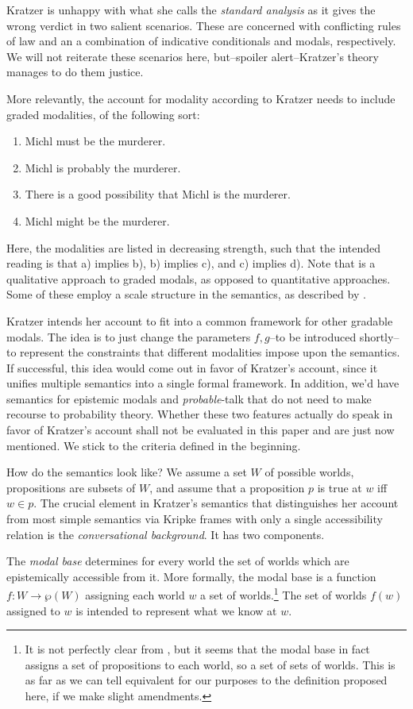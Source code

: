 \documentclass{article}
\theoremstyle{definition}
\begin{document}
Kratzer is unhappy with what she calls the \emph{standard analysis} as it gives the wrong verdict in two salient scenarios.
These are concerned with conflicting rules of law and an a combination of indicative conditionals and modals, respectively.
We will not reiterate these scenarios here, but--spoiler alert--Kratzer's theory manages to do them justice.

More relevantly, the account for modality according to Kratzer needs to include graded modalities, of the following sort:
\begin{enumerate}[nosep,label=\alph*)]
  \item Michl must be the murderer.
  \item Michl is probably the murderer.
  \item There is a good possibility that Michl is the murderer.
  \item Michl might be the murderer.
\end{enumerate}
Here, the modalities are listed in decreasing strength, such that the intended reading is that a) implies b), b) implies c), and c) implies d).
Note that is a qualitative approach to graded modals, as opposed to quantitative approaches. Some of these employ a scale structure in the semantics, as described by \textcite{lassiter10_gradab}.

Kratzer intends her account to fit into a common framework for other gradable modals.
The idea is to just change the parameters $f,g$--to be introduced shortly--to represent the constraints that different modalities impose upon the semantics.
If successful, this idea would come out in favor of Kratzer's account, since it unifies multiple semantics into a single formal framework.
In addition, we'd have semantics for epistemic modals and \emph{probable}-talk that do not need to make recourse to probability theory.
Whether these two features actually do speak in favor of Kratzer's account shall not be evaluated in this paper and are just now mentioned.
We stick to the criteria defined in the beginning.

How do the semantics look like?
We assume a set $W$ of possible worlds, propositions are subsets of $W$, and assume that a proposition $p$ is true at $w$ iff $w \in p$.
The crucial element in Kratzer's semantics that distinguishes her account from most simple semantics via Kripke frames with only a single accessibility relation is the \emph{conversational background}.
It has two components.

The \emph{modal base} determines for every world the set of worlds which are epistemically accessible from it.
More formally, the modal base is a function $f: W \rightarrow \wp(W)$ assigning each world $w$ a set of worlds.\footnote{It is not perfectly clear from \textcite[][p.~644]{kratzer91_modal}, but it seems that the modal base in fact assigns a set of propositions to each world, so a set of sets of worlds. This is as far as we can tell equivalent for our purposes to the definition proposed here, if we make slight amendments.}
The set of worlds $f(w)$ assigned to $w$ is intended to represent what we know at $w$.
\end{document}
